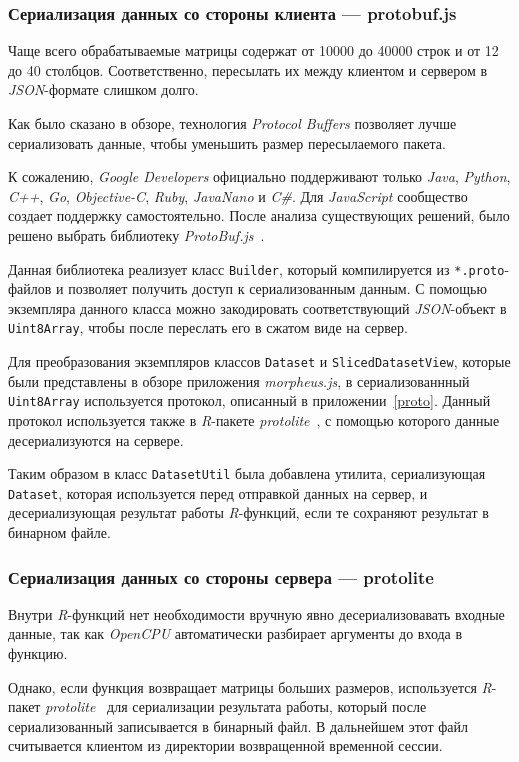 \subsubsection{Сериализация данных со стороны клиента --- protobuf.js}
Чаще всего обрабатываемые матрицы содержат от 10000 до 40000 строк и от 12 до 40 столбцов. Соответственно, пересылать их между клиентом и сервером в \emph{JSON}-формате слишком долго.

Как было сказано в обзоре, технология \emph{Protocol Buffers} позволяет лучше сериализовать данные, чтобы уменьшить размер пересылаемого пакета.

К сожалению, \emph{Google Developers} официально поддерживают только \emph{Java}, \emph{Python}, \emph{C++}, \emph{Go}, \emph{Objective-C}, \emph{Ruby}, \emph{JavaNano} и \emph{C\#}. Для \emph{JavaScript} сообщество создает поддержку самостоятельно. После анализа существующих решений, было решено выбрать библиотеку \emph{ProtoBuf.js}~\cite{protobufjs}.

Данная библиотека реализует класс \texttt{Builder}, который компилируется из \texttt{*.proto}-файлов и позволяет получить доступ к сериализованным данным. С помощью экземпляра данного класса можно закодировать соответствующий \emph{JSON}-объект в \texttt{Uint8Array}, чтобы после переслать его в сжатом виде на сервер.

Для преобразования экземпляров классов \texttt{Dataset} и \texttt{SlicedDatasetView}, которые были представлены в обзоре приложения \emph{morpheus.js}, в сериализованнный \texttt{Uint8Array} используется протокол, описанный в приложении~\ref{proto}. Данный протокол используется также в \emph{R}-пакете \emph{protolite}~\cite{protolite}, с помощью которого данные десериализуются на сервере.

Таким образом в класс \texttt{DatasetUtil} была добавлена утилита, сериализующая \texttt{Dataset}, которая используется перед отправкой данных на сервер, и десериализующая результат работы \emph{R}-функций, если те сохраняют результат в бинарном файле. 
\subsubsection{Сериализация данных со стороны сервера --- protolite}
Внутри \emph{R}-функций нет необходимости вручную явно десериализовавать входные данные, так как \emph{OpenCPU} автоматически разбирает аргументы до входа в функцию.

Однако, если функция возвращает матрицы больших размеров, используется \emph{R}-пакет \emph{protolite}~\cite{protolite} для сериализации результата работы, который после сериализованный записывается в бинарный файл. В дальнейшем этот файл считывается клиентом из директории возвращенной временной сессии. 

